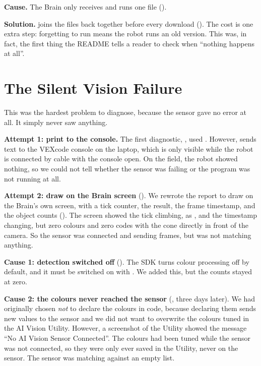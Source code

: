 \textbf{Cause.} The Brain only receives and runs one file ().

\textbf{Solution.}  joins the files back together before every
download (). The cost is one extra step: forgetting to run
 means the robot runs an old version. This was, in fact, the first
thing the README tells a reader to check when ``nothing happens at all''.

\section{The Silent Vision Failure}
\label{sec:ch-silent}

This was the hardest problem to diagnose, because the sensor gave no error at
all. It simply never saw anything.

\textbf{Attempt 1: print to the console.} The first diagnostic, ,
used . However,  sends text to the VEXcode console on
the laptop, which is only visible while the robot is connected by cable with the
console open. On the field, the robot showed nothing, so we could not tell
whether the sensor was failing or the program was not running at all.

\textbf{Attempt 2: draw on the Brain screen} (). We rewrote the
report to draw on the Brain's own screen, with a tick counter, the
 result, the frame timestamp, and the object counts
(). The screen showed the tick climbing, 
as , and the timestamp changing, but zero colours and zero codes with
the cone directly in front of the camera. So the sensor was connected and sending
frames, but was not matching anything.

\textbf{Cause 1: detection switched off} (). The SDK turns colour
processing off by default, and it must be switched on with
. We added this, but the counts stayed at zero.

\textbf{Cause 2: the colours never reached the sensor} (, three
days later). We had originally chosen \emph{not} to declare the colours in code,
because declaring them sends new values to the sensor and we did not want to
overwrite the colours tuned in the AI Vision Utility. However, a screenshot of
the Utility showed the message ``No AI Vision Sensor Connected''. The colours had
been tuned while the sensor was not connected, so they were only ever saved in
the Utility, never on the sensor. The sensor was matching against an empty list.

